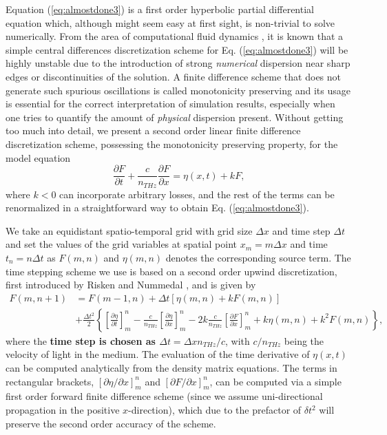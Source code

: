 \documentclass[preprint,secnumarabic,amssymb, nobibnotes, aip, prd]{revtex4-1}
\begin{document}
Equation (\ref{eq:almostdone3}) is a first order hyperbolic partial differential equation which, although might seem easy at first sight, is non-trivial to solve numerically. From the area of computational fluid dynamics
\cite{wesseling2009principles}, it is known that a simple central differences
discretization scheme for Eq. (\ref{eq:almostdone3}) will be highly unstable due to
the introduction of strong \emph{numerical} dispersion near sharp edges or
discontinuities of the solution. A finite difference scheme that does not
generate such spurious oscillations is called monotonicity preserving
\cite{wesseling2009principles} and its usage is essential for the correct
interpretation of simulation results, especially when one tries to quantify
the amount of \emph{physical} dispersion present. Without getting too much
into detail, we present a second order linear finite difference discretization
scheme, possessing the monotonicity preserving property, for the model equation
\begin{equation}
\label{eq:model-equation}
\frac{\partial F}{\partial t}+ \frac{c}{n_{THz}}\frac{\partial F}{\partial
	x}=\eta(x,t)+kF,%
\end{equation}
where $k<0$ can incorporate arbitrary losses, and the rest of the terms can be renormalized in a straightforward way to obtain Eq. (\ref{eq:almostdone3}).

We take an equidistant spatio-temporal grid with grid size $\Delta x$ and time
step $\Delta t$ and set the values of the grid variables at spatial point
$x_{m}=m\Delta x$ and time $t_{n}=n\Delta t$ as $F(m,n)$ and $\eta(m,n)$ denotes the corresponding source term. The time stepping scheme we use is based on a second order upwind discretization, first introduced by Risken and Nummedal \cite{risken1968self}, and is given by
\begin{align}
\label{eq:numerics}
F(m,n+1) &  =F(m-1,n)+\Delta t\left[ \eta(m,n)+kF(m,n)\right]  \nonumber\\
&  +\frac{\Delta t^{2}}{2}\left\{  \left[  \frac{\partial \eta}{\partial
	t}\right]_{m}^{n}- \frac{c}{n_{THz}}\left[  \frac{\partial \eta}{\partial x}\right]
_{m}^{n}-2k\frac{c}{n_{THz}}\left[  \frac{\partial F}{\partial x}\right]_{m}%
^{n}+k\eta(m,n)+k^{2}F(m,n)\right\}  ,
\end{align}
where the \textbf{time step is chosen as $\Delta t=\Delta xn_{THz}/c$}, with $c/n_{THz}$
being the velocity of light in the medium. The evaluation of the time
derivative of $\eta(x,t)$ can be computed analytically from the density matrix
equations. The terms in rectangular brackets, $\left[
\partial \eta/\partial x\right]_{m}^{n}$ and $\left[  \partial F/\partial x\right]  _{m}^{n}$, can be computed via a simple first order forward
finite difference scheme (since we assume uni-directional propagation in the positive $x$-direction), which due to the prefactor of $\delta t^2$ will preserve the second order accuracy of the scheme.  

\end{document}
